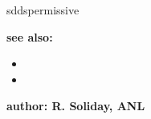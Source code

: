 \begin{sddsprog}{sddspermissive}
\item {\bf see also:}
\begin{itemize}
\item {}
\item {}
\end{itemize}

\item {\bf author: R. Soliday, ANL}
\end{sddsprog}
